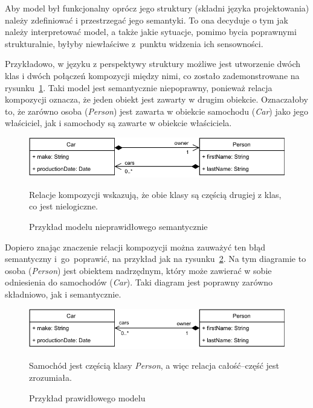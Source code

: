 Aby model był funkcjonalny oprócz jego struktury (składni języka projektowania)
należy zdefiniować i przestrzegać jego semantyki. To ona decyduje o tym jak
należy interpretować model, a także jakie sytuacje, pomimo bycia poprawnymi
strukturalnie, byłyby niewłaściwe z~punktu widzenia ich sensowności.

Przykładowo, w języku  z perspektywy struktury możliwe jest
utworzenie dwóch klas i dwóch połączeń kompozycji między nimi, co zostało
zademonstrowane na rysunku~\ref{rys:nieprawidlowy-model-uml}. Taki model jest
semantycznie niepoprawny, ponieważ relacja kompozycji oznacza, że jeden obiekt
jest zawarty w drugim obiekcie. Oznaczałoby to, że zarówno osoba
(\emph{Person}) jest zawarta w obiekcie samochodu (\emph{Car}) jako jego
właściciel, jak i samochody są zawarte w obiekcie właściciela.

\begin{figure}[!hb]
	\centering

	\includegraphics[width=0.95\linewidth]{./images/invalid-uml-example.pdf}
	\caption{Przykład modelu  nieprawidłowego
		semantycznie}\label{rys:nieprawidlowy-model-uml}
	\medskip
	{\small Relacje kompozycji wskazują, że obie klasy są częścią drugiej z
		klas, co jest nielogiczne.}
\end{figure}

Dopiero znając znaczenie relacji kompozycji można zauważyć ten błąd semantyczny
i~go~poprawić, na przykład jak na rysunku~\ref{rys:prawidlowy-model-uml}. Na
tym diagramie to osoba (\emph{Person}) jest obiektem nadrzędnym, który może
zawierać w sobie odniesienia do samochodów (\emph{Car}). Taki diagram jest
poprawny zarówno składniowo, jak i semantycznie.

\begin{figure}[!hb]
	\centering

	\includegraphics[width=0.95\linewidth]{./images/valid-uml-example.pdf}
	\caption{Przykład prawidłowego modelu
		}\label{rys:prawidlowy-model-uml}
	\medskip
	{\small Samochód jest częścią klasy \emph{Person}, a więc relacja
		całość--część jest zrozumiała.}
\end{figure}

